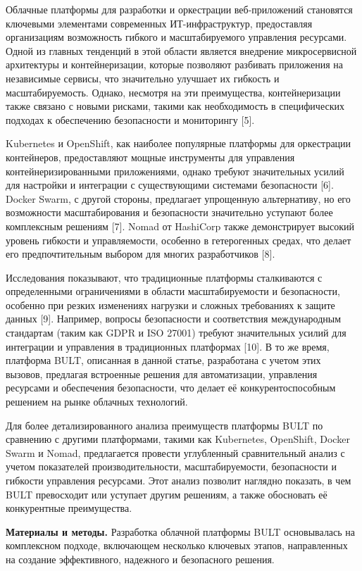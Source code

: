 \documentclass[
]{article}
\begin{document}
Облачные платформы для разработки и оркестрации веб-приложений
становятся ключевыми элементами современных ИТ-инфраструктур,
предоставляя организациям возможность гибкого и масштабируемого
управления ресурсами. Одной из главных тенденций в этой области является
внедрение микросервисной архитектуры и контейнеризации, которые
позволяют разбивать приложения на независимые сервисы, что значительно
улучшает их гибкость и масштабируемость. Однако, несмотря на эти
преимущества, контейнеризации также связано с новыми рисками, такими как
необходимость в специфических подходах к обеспечению безопасности и
мониторингу {[}5{]}.

Kubernetes и OpenShift, как наиболее популярные платформы для
оркестрации контейнеров, предоставляют мощные инструменты для управления
контейнеризированными приложениями, однако требуют значительных усилий
для настройки и интеграции с существующими системами безопасности
{[}6{]}. Docker Swarm, с другой стороны, предлагает упрощенную
альтернативу, но его возможности масштабирования и безопасности
значительно уступают более комплексным решениям {[}7{]}. Nomad от
HashiCorp также демонстрирует высокий уровень гибкости и управляемости,
особенно в гетерогенных средах, что делает его предпочтительным выбором
для многих разработчиков {[}8{]}.

Исследования показывают, что традиционные платформы сталкиваются с
определенными ограничениями в области масштабируемости и безопасности,
особенно при резких изменениях нагрузки и сложных требованиях к защите
данных {[}9{]}. Например, вопросы безопасности и соответствия
международным стандартам (таким как GDPR и ISO 27001) требуют
значительных усилий для интеграции и управления в традиционных
платформах {[}10{]}. В то же время, платформа BULT, описанная в данной
статье, разработана с учетом этих вызовов, предлагая встроенные решения
для автоматизации, управления ресурсами и обеспечения безопасности, что
делает её конкурентоспособным решением на рынке облачных технологий.

Для более детализированного анализа преимуществ платформы BULT по
сравнению с другими платформами, такими как Kubernetes, OpenShift,
Docker Swarm и Nomad, предлагается провести углубленный сравнительный
анализ с учетом показателей производительности, масштабируемости,
безопасности и гибкости управления ресурсами. Этот анализ позволит
наглядно показать, в чем BULT превосходит или уступает другим решениям,
а также обосновать её конкурентные преимущества.

\textbf{Материалы и методы.} Разработка облачной платформы BULT
основывалась на комплексном подходе, включающем несколько ключевых
этапов, направленных на создание эффективного, надежного и безопасного
решения.
\end{document}
